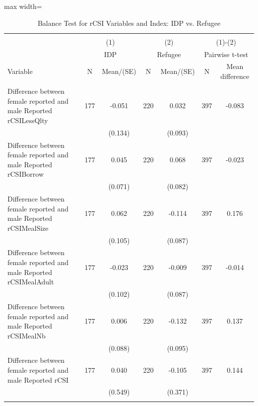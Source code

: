 \documentclass{article}
\begin{document}
\begin{table}[!htbp]
\centering
\caption{Balance Test for rCSI Variables and Index: IDP vs. Refugee}
\begin{adjustbox}{max width=\textwidth}
\begin{tabular}{@{\extracolsep{5pt}}lcccccc}
\\[-1.8ex]\hline \hline \\[-1.8ex]
 & \multicolumn{2}{c}{(1)}  & \multicolumn{2}{c}{(2)}  & \multicolumn{2}{c}{(1)-(2)} \\
 & \multicolumn{2}{c}{IDP}  & \multicolumn{2}{c}{Refugee}  & \multicolumn{2}{c}{Pairwise t-test}  \\
Variable & N & Mean/(SE) & N & Mean/(SE) & N & Mean difference \\ \hline \\[-1.8ex] 
Difference between female reported and male Reported rCSILessQlty   & 177    & -0.051    & 220    & 0.032    & 397    & -0.083   \\
 &   & (0.134)  &   & (0.093)  &   &  \\ [1ex]
Difference between female reported and male Reported rCSIBorrow   & 177    & 0.045    & 220    & 0.068    & 397    & -0.023   \\
 &   & (0.071)  &   & (0.082)  &   &  \\ [1ex]
Difference between female reported and male Reported rCSIMealSize   & 177    & 0.062    & 220    & -0.114    & 397    & 0.176   \\
 &   & (0.105)  &   & (0.087)  &   &  \\ [1ex]
Difference between female reported and male Reported rCSIMealAdult   & 177    & -0.023    & 220    & -0.009    & 397    & -0.014   \\
 &   & (0.102)  &   & (0.087)  &   &  \\ [1ex]
Difference between female reported and male Reported rCSIMealNb   & 177    & 0.006    & 220    & -0.132    & 397    & 0.137   \\
 &   & (0.088)  &   & (0.095)  &   &  \\ [1ex]
Difference between female reported and male Reported rCSI   & 177    & 0.040    & 220    & -0.105    & 397    & 0.144   \\
 &   & (0.549)  &   & (0.371)  &   &  \\ [1ex]
\hline \hline \\[-1.8ex]

\end{tabular}
\end{adjustbox}
\end{table}
\end{document}

